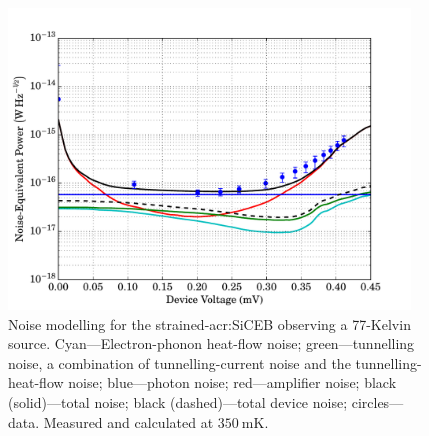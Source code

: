 \begin{figure}[tb]
\begin{center}
\includegraphics[width = 0.95\textwidth]{figures/strained_noiseModel77}
\caption[Noise modelling for the strained-\gls{acr:SiCEB} observing a 77-Kelvin source]{Noise modelling for the strained-\gls{acr:SiCEB} observing a 77-Kelvin source. Cyan---Electron-phonon heat-flow noise; green---tunnelling noise, a combination of tunnelling-current noise and the tunnelling-heat-flow noise; blue---photon noise; red---amplifier noise; black (solid)---total noise; black (dashed)---total device noise; circles---data. Measured and calculated at $350~\mathrm{mK}$.}
\label{fig:strainedNoiseModel77}
\end{center}
\end{figure}
\par 
